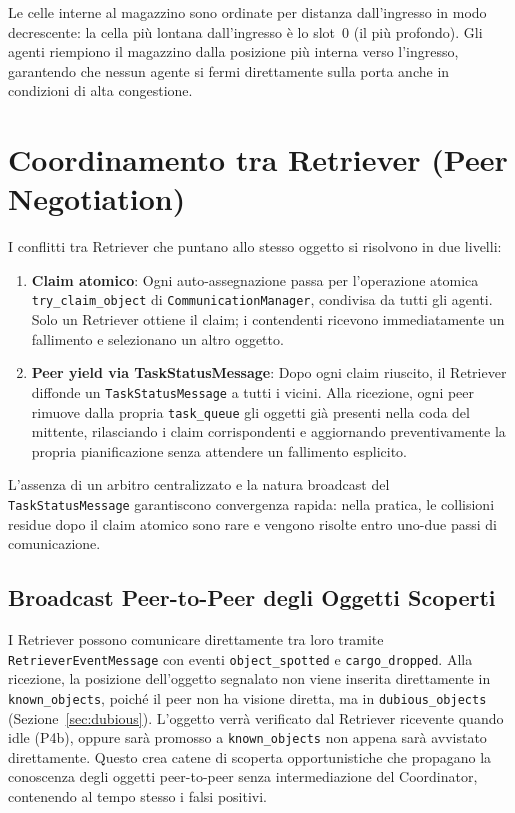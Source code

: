 Le celle interne al magazzino sono ordinate per distanza dall'ingresso in modo
decrescente: la cella pi\`u lontana dall'ingresso \`e lo slot~0 (il pi\`u profondo).
Gli agenti riempiono il magazzino dalla posizione pi\`u interna verso l'ingresso,
garantendo che nessun agente si fermi direttamente sulla porta anche in condizioni
di alta congestione.

\section{Coordinamento tra Retriever (Peer Negotiation)}

I conflitti tra Retriever che puntano allo stesso oggetto si risolvono in due livelli:

\begin{enumerate}
    \item \textbf{Claim atomico}: Ogni auto-assegnazione passa per
          l'operazione atomica \texttt{try\_claim\_object} di
          \texttt{CommunicationManager}, condivisa da tutti gli agenti.
          Solo un Retriever ottiene il claim; i contendenti ricevono
          immediatamente un fallimento e selezionano un altro oggetto.
    \item \textbf{Peer yield via TaskStatusMessage}: Dopo ogni claim
          riuscito, il Retriever diffonde un \texttt{TaskStatusMessage} a tutti i vicini.
          Alla ricezione, ogni peer rimuove dalla propria \texttt{task\_queue} gli oggetti
          gi\`a presenti nella coda del mittente, rilasciando i claim corrispondenti e
          aggiornando preventivamente la propria pianificazione senza attendere un
          fallimento esplicito.
\end{enumerate}

L'assenza di un arbitro centralizzato e la natura broadcast del \texttt{TaskStatusMessage}
garantiscono convergenza rapida: nella pratica, le collisioni residue dopo il claim atomico
sono rare e vengono risolte entro uno-due passi di comunicazione.

\subsection{Broadcast Peer-to-Peer degli Oggetti Scoperti}

I Retriever possono comunicare direttamente tra loro tramite
\texttt{RetrieverEventMessage} con eventi \texttt{object\_spotted} e
\texttt{cargo\_dropped}. Alla ricezione, la posizione dell'oggetto segnalato non
viene inserita direttamente in \texttt{known\_objects}, poich\'e il peer non ha
visione diretta, ma in \texttt{dubious\_objects} (Sezione~\ref{sec:dubious}).
L'oggetto verr\`a verificato dal Retriever ricevente quando idle (P4b), oppure
sar\`a promosso a \texttt{known\_objects} non appena sar\`a avvistato direttamente.
Questo crea catene di scoperta opportunistiche che propagano la conoscenza degli
oggetti peer-to-peer senza intermediazione del Coordinator, contenendo al tempo
stesso i falsi positivi.

